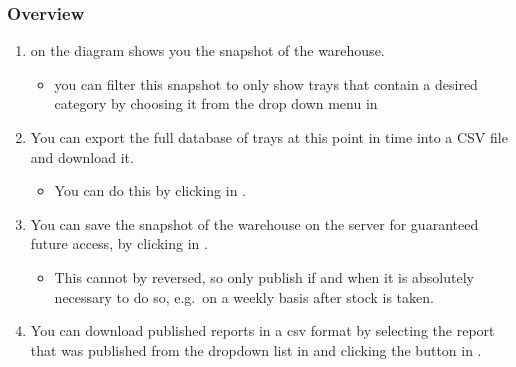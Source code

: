 \documentclass[letterpaper,10pt,english]{sphinxmanual}
\let\sphinxpxdimen\pdfpxdimen\else\newdimen\sphinxpxdimen
\begin{document}
\noindent{\hspace*{\fill}\sphinxincludegraphics[width=500\sphinxpxdimen]{{reportsSections}.png}\hspace*{\fill}}


\subsubsection{Overview}
\label{\detokenize{docs/ui/reports:overview}}\begin{enumerate}
%
\item {} 
 on the diagram shows you the snapshot of the warehouse.
\begin{itemize}
\item {} 
you can filter this snapshot to only show trays that contain a
desired category by choosing it from the drop down menu in

\end{itemize}

\item {} 
You can export the full database of trays at this point in time into
a CSV file and download it.
\begin{itemize}
\item {} 
You can do this by clicking  in .

\end{itemize}

\item {} 
You can save the snapshot of the warehouse on the server for
guaranteed future access, by clicking  in
.
\begin{itemize}
\item {} 
This cannot by reversed, so only publish if and when it is
absolutely necessary to do so, e.g. on a weekly basis after stock
is taken.

\end{itemize}

\item {} 
You can download published reports in a csv format by selecting the
report that was published from the dropdown list in
 and clicking the  button in
.

\end{enumerate}
\end{document}
